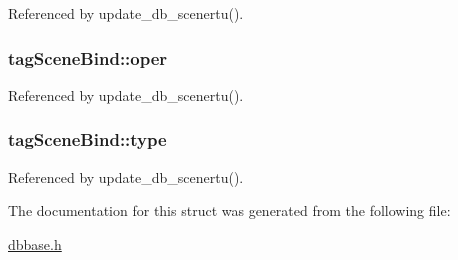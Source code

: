 Referenced by update\-\_\-db\-\_\-scenertu().

\hypertarget{structtagSceneBind_a58ac928d8b24858fb34900db40745171}{
\subsubsection[{oper}]{ tag\-Scene\-Bind\-::oper}}\label{structtagSceneBind_a58ac928d8b24858fb34900db40745171}


Referenced by update\-\_\-db\-\_\-scenertu().

\hypertarget{structtagSceneBind_a0e30d959ea0e866b737beb4560d3250a}{
\subsubsection[{type}]{ tag\-Scene\-Bind\-::type}}\label{structtagSceneBind_a0e30d959ea0e866b737beb4560d3250a}


Referenced by update\-\_\-db\-\_\-scenertu().



The documentation for this struct was generated from the following file\-:\begin{DoxyCompactItemize}
\item 
\hyperlink{dbbase_8h}{dbbase.\-h}\end{DoxyCompactItemize}
